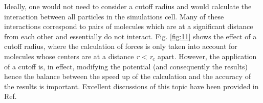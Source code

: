 \documentclass[9pt,bestpractices]{livecoms}
\begin{document}

Ideally, one would not need to consider a cutoff radius and would calculate the
interaction between all particles in the simulations cell. Many of these
interactions correspond to pairs of molecules which are at a significant
distance from each other and essentially do not interact. Fig. \ref{fig:11} shows the
effect of a cutoff radius, where the calculation of forces is only taken into
account for molecules whose centers are at a distance \textit{r} {\textless}
\textit{r}$_{c}$ apart. However, the application of a cutoff is, in effect,
modifying the potential (and consequently the results) hence the balance
between the speed up of the calculation and the accuracy of the results is
important. Excellent discussions of this topic have been provided in Ref.
\citep{holcomb1993,trokhymchuk1999,mecke1997,duque2004,blas2008}
\end{document}
